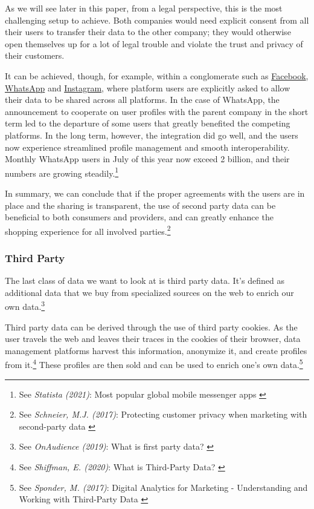 As we will see later in this paper, from a legal perspective, this is the most challenging setup to achieve. Both companies would need explicit consent from all their users to transfer their data to the other company; they would otherwise open themselves up for a lot of legal trouble and violate the trust and privacy of their customers.

It can be achieved, though, for example, within a conglomerate such as \href{https://www.facebook.com/}{Facebook}, \href{https://www.whatsapp.com/}{WhatsApp} and \href{https://www.instagram.com/}{Instagram}, where platform users are explicitly asked to allow their data to be shared across all platforms. In the case of WhatsApp, the announcement to cooperate on user profiles with the parent company in the short term led to the departure of some users that greatly benefited the competing platforms. In the long term, however, the integration did go well, and the users now experience streamlined profile management and smooth interoperability. Monthly WhatsApp users in July of this year now exceed 2 billion, and their numbers are growing steadily.\footnote{See \textit{Statista (2021)}: Most popular global mobile messenger apps \cite{whatsStats}}

In summary, we can conclude that if the proper agreements with the users are in place and the sharing is transparent, the use of second party data can be beneficial to both consumers and providers, and can greatly enhance the shopping experience for all involved parties.\footnote{See \textit{Schneier, M.J. (2017)}: Protecting customer privacy when marketing with second-party data \cite{secondParty}}

\subsubsection{Third Party}

The last class of data we want to look at is third party data. It's defined as additional data that we buy from specialized sources on the web to enrich our own data.\footnote{See \textit{OnAudience (2019)}: What is first party data? \cite{firstParty}}

Third party data can be derived through the use of third party cookies. As the user travels the web and leaves their traces in the cookies of their browser, data management platforms harvest this information, anonymize it, and create profiles from it.\footnote{See \textit{Shiffman, E. (2020)}: What is Third-Party Data? \cite{thirdParty}} These profiles are then sold and can be used to enrich one's own data.\footnote{See \textit{Sponder, M. (2017)}: Digital Analytics for Marketing - Understanding and Working with Third-Party Data \cite{digitalAnalytics}}

